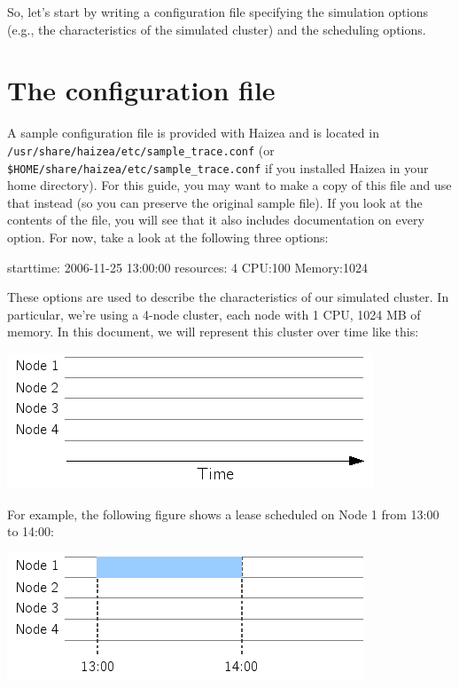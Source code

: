 So, let's start by writing a configuration file specifying the simulation options (e.g., the characteristics of the simulated cluster) and the scheduling options.

\section{The configuration file}

A sample configuration file is provided with Haizea and is located in \texttt{/usr/share/haizea/etc/sample\_trace.conf} (or \texttt{\$HOME/share/haizea/etc/sample\_trace.conf} if you installed Haizea in your home directory). For this guide, you may want to make a copy of this file and use that instead (so you can preserve the original sample file). If you look at the contents of the file, you will see that it also includes documentation on every option. For now, take a look at the following three options:

\begin{wideshellverbatim}
[simulation]
starttime: 2006-11-25 13:00:00
resources: 4  CPU:100 Memory:1024
\end{wideshellverbatim}

These options are used to describe the characteristics of our simulated cluster. In particular, we're using a 4-node cluster, each node with 1 CPU, 1024 MB of memory. In this document, we will represent this cluster over time like this:

\begin{center}
\includegraphics{images/quickstart_leasegraph1.png}
\end{center}

For example, the following figure shows a lease scheduled on Node 1 from 13:00 to 14:00:

\begin{center}
\includegraphics{images/quickstart_leasegraph2.png}
\end{center}

